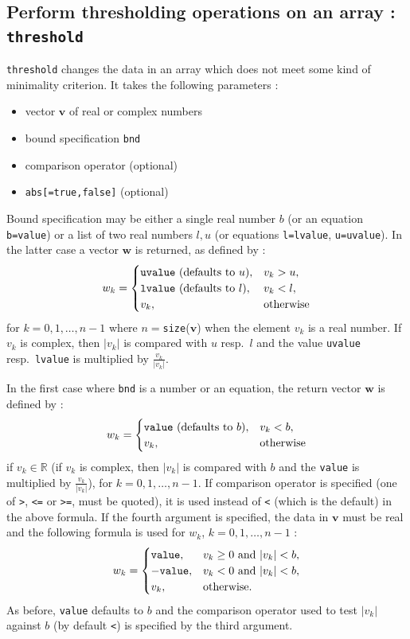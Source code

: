 \documentclass[a4paper,11pt]{book}
\begin{document}
\subsection{Perform thresholding operations on an array : {\tt threshold}}
{\tt threshold} changes the data in an array which does not meet some kind of minimality criterion. It takes the following parameters :
\begin{itemize}
	\item vector $ \mathbf{v} $ of real or complex numbers
	\item bound specification {\tt bnd}
	\item comparison operator (optional)
	\item {\tt abs[=true,false]} (optional)
\end{itemize}
Bound specification may be either a single real number $ b $ (or an equation {\tt b=value}) or a list of two real numbers $ l,u $ (or equations {\tt l=lvalue}, {\tt u=uvalue}). In the latter case a vector $ \mathbf{w} $ is returned, as defined by :
\[ w_k=\begin{cases}
\text{{\tt uvalue} (defaults to $ u $)},&v_k>u,\\
\text{{\tt lvalue} (defaults to $ l $)},&v_k<l,\\
v_k,&\text{otherwise}
\end{cases} \]
for $ k=0,1,\dots,n-1 $ where $ n= ${\tt size}($ \mathbf{v} $) when the element $ v_k $ is a real number. If $ v_k $ is complex, then $ |v_k| $ is compared with $ u $ resp.~$ l $ and the value {\tt uvalue} resp.~{\tt lvalue} is multiplied by $ \frac{v_k}{|v_k|} $.

In the first case where {\tt bnd} is a number or an equation, the return vector $ \mathbf{w} $ is defined by :
\[ w_k=\begin{cases}
\text{{\tt value} (defaults to $ b $)},&v_k<b,\\
v_k,&\text{otherwise}
\end{cases} \]
if $ v_k\in\mathbb{R} $ (if $ v_k $ is complex, then $ |v_k| $ is compared with $ b $ and the {\tt value} is multiplied by $ \frac{v_k}{|v_k|} $), for $ k=0,1,\dots,n-1 $. If comparison operator is specified (one of {\tt >}, {\tt <=} or {\tt >=}, must be quoted), it is used instead of {\tt <} (which is the default) in the above formula. If the fourth argument is specified, the data in $ \mathbf{v} $ must be real and the following formula is used for $ w_k $, $ k=0,1,\dots,n-1 $ :
\[ w_k=\begin{cases}
\text{{\tt value}},& \text{$ v_k\geq 0 $ and $ |v_k|<b $},\\
-\text{{\tt value}},& \text{$ v_k<0 $ and $ |v_k|<b $},\\
v_k,&\text{otherwise}.
\end{cases} \]
As before, {\tt value} defaults to $ b $ and the comparison operator used to test $ |v_k| $ against $ b $ (by default {\tt <}) is specified by the third argument.
\end{document}
